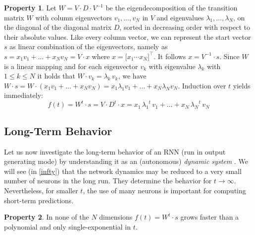 \documentclass[twoside,11pt]{article}
\theoremstyle{definition}
\newtheorem{prop}{Property}
\newtheorem{remk}{Remark}
\begin{document}
\begin{prop}\label{eigen}
Let $W = V \cdot D \cdot V^{-1}$ be the eigendecomposition of the transition matrix $W$ with column
eigenvectors $v_1,\dots,v_N$ in $V$ and eigenvalues $\lambda_1, \dots, \lambda_N$,
on the diagonal of the diagonal matrix $D$, sorted in decreasing order with
respect to their absolute values. Like every column vector, we can represent the
start vector $s$ as linear combination of the eigenvectors, namely as $s =
x_1 v_1 + \dots + x_N v_N = V \cdot x$ where $x = \big[ x_1 \cdots x_N
\big]^\top$. It follows $x = V^{-1} \cdot s$.
Since $W$ is a linear mapping and for each eigenvector $v_k$ with eigenvalue
$\lambda_k$ with $1 \le k \le N$ it holds that $W \cdot v_k = \lambda_k\, v_k$, we
have $W \cdot s = W \cdot (x_1 v_1 + \dots + x_N v_N) = x_1 \lambda_1 v_1 +
\dots + x_N \lambda_N v_N$. Induction over $t$ yields immediately:
\begin{equation}\label{form}
	f(t) = W^t \cdot s = V \cdot D^t \cdot x =
	x_1\,{\lambda_1}^t\,v_1 + \dots + x_N\,{\lambda_N}^t\,v_N
\end{equation}
\end{prop}


\subsection{Long-Term Behavior}\label{ellipse}

Let us now investigate the long-term behavior of an RNN (run in output generating
mode) by understanding it as an (autonomous) \emph{dynamic system} \citep{CK14,Str15}.
We will see (in \cref{infty}) that the network dynamics may be reduced to a
very small number of neurons in the long run. They determine the behavior for $t
\to \infty$. Nevertheless, for smaller $t$, the use of many neurons is important
for computing short-term predictions.

\begin{prop}\label{exponential}
In none of the $N$ dimensions $f(t) = W^t \cdot s$ grows faster than a
polynomial and only single-exponential in $t$.
\end{prop}
\end{document}
